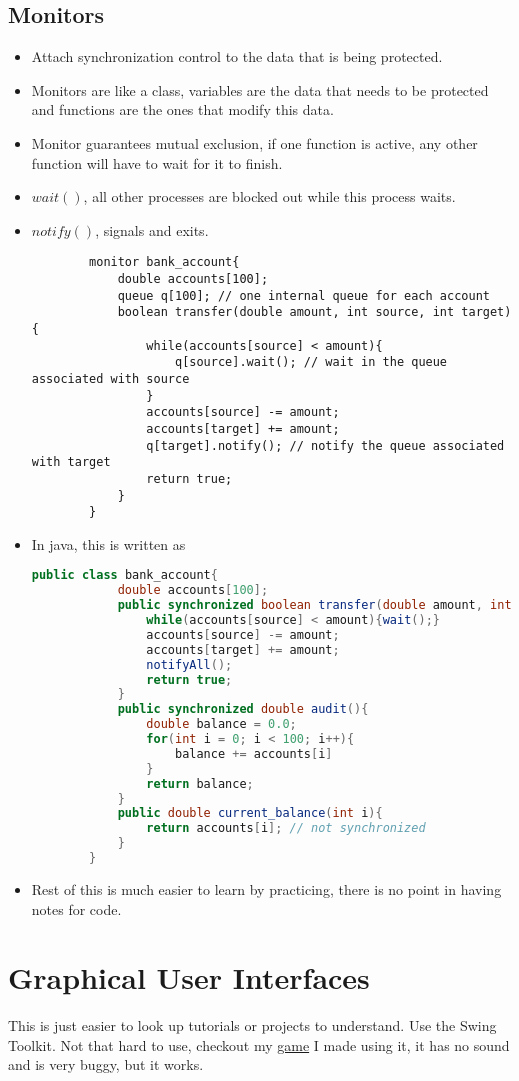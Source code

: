 \documentclass[a4paper]{article}
\begin{document}
\subsection{Monitors}
\begin{itemize}
    \item Attach synchronization control to the data that is being protected.
    \item Monitors are like a class, variables are the data that needs to be protected and functions are the ones that modify this data.
    \item Monitor guarantees mutual exclusion, if one function is active, any other function will have to wait for it to finish.
    \item $wait()$, all other processes are blocked out while this process waits.
    \item $notify()$, signals and exits.
    \begin{lstlisting}
        monitor bank_account{
            double accounts[100];
            queue q[100]; // one internal queue for each account
            boolean transfer(double amount, int source, int target){
                while(accounts[source] < amount){
                    q[source].wait(); // wait in the queue associated with source
                }
                accounts[source] -= amount;
                accounts[target] += amount;
                q[target].notify(); // notify the queue associated with target
                return true;
            }
        }
    \end{lstlisting}
    \item In java, this is written as
    \begin{lstlisting}[language=Java]
        public class bank_account{
            double accounts[100];
            public synchronized boolean transfer(double amount, int source, int target){
                while(accounts[source] < amount){wait();}
                accounts[source] -= amount;
                accounts[target] += amount;
                notifyAll();
                return true;
            }
            public synchronized double audit(){
                double balance = 0.0;
                for(int i = 0; i < 100; i++){
                    balance += accounts[i]
                }
                return balance;
            }
            public double current_balance(int i){
                return accounts[i]; // not synchronized
            }
        }
    \end{lstlisting}
    \item Rest of this is much easier to learn by practicing, there is no point in having notes for code.
\end{itemize}

\section{Graphical User Interfaces}
This is just easier to look up tutorials or projects to understand. Use the Swing Toolkit. Not that hard to use, checkout my \href{https://github.com/Risdorn/Mystery-Maze-Gameathon}{game} I made using it, it has no sound and is very buggy, but it works.
\end{document}
